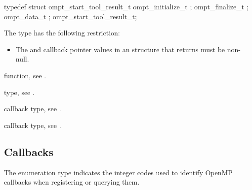\format
\begin{ccppspecific}
\begin{omptOther}
typedef struct ompt_start_tool_result_t {
  ompt_initialize_t ;
  ompt_finalize_t ;
  ompt_data_t ;
} ompt_start_tool_result_t;
\end{omptOther}
\end{ccppspecific}

\restrictions
The  type has the following restriction:

\begin{itemize}
\item The  and  callback pointer values in an
       structure that  
      returns must be non-null.
\end{itemize}

\begin{crossrefs}
\item {} function, see .

\item {} type, see .

\item {} callback type, see .

\item {} callback type, see .
\end{crossrefs}

\subsection{Callbacks}
\label{sec:ompt_callbacks_t}

\summary
The  enumeration type indicates the integer codes 
used to identify OpenMP callbacks when registering or querying them.

